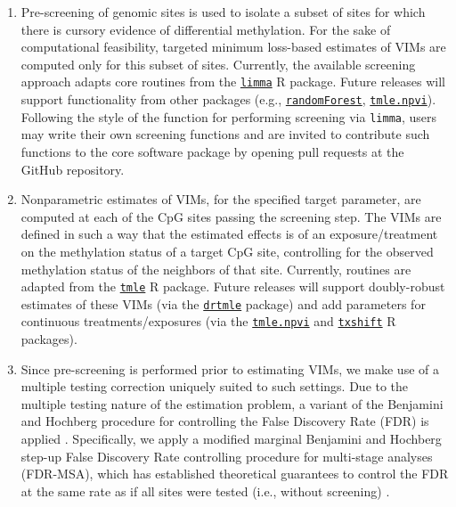 \documentclass[9pt,a4paper,]{extarticle}
\theoremstyle{definition}
\theoremstyle{definition}
\theoremstyle{definition}
\theoremstyle{remark}
\begin{document}
\begin{enumerate}
\def\labelenumi{\arabic{enumi}.}
\item
  Pre-screening of genomic sites is used to isolate a subset of sites for
  which there is cursory evidence of differential methylation. For the sake of
  computational feasibility, targeted minimum loss-based estimates of VIMs are
  computed only for this subset of sites. Currently, the available screening
  approach adapts core routines from the
  \href{http://bioconductor.org/packages/limma}{\texttt{limma}} R
  package. Future releases will support functionality from other packages
  (e.g., \href{https://CRAN.R-project.org/package=randomForest}{\texttt{randomForest}},
  \href{https://CRAN.R-project.org/package=tmle.npvi}{\texttt{tmle.npvi}}). Following the
  style of the function for performing screening via \texttt{limma}, users may write
  their own screening functions and are invited to contribute such functions to
  the core software package by opening pull requests at the GitHub repository.
\item
  Nonparametric estimates of VIMs, for the specified target parameter, are
  computed at each of the CpG sites passing the screening step. The VIMs are
  defined in such a way that the estimated effects is of an exposure/treatment
  on the methylation status of a target CpG site, controlling for the observed
  methylation status of the neighbors of that site. Currently, routines are
  adapted from the \href{https://CRAN.R-project.org/package=tmle}{\texttt{tmle}} R package.
  Future releases will support doubly-robust estimates of these VIMs (via the
  \href{https://cran.r-project.org/package=drtmle}{\texttt{drtmle}} package)
  and add parameters for continuous treatments/exposures (via the
  \href{https://CRAN.R-project.org/package=tmle.npvi}{\texttt{tmle.npvi}} and
  \href{https://github.com/nhejazi/txshift}{\texttt{txshift}} R packages).
\item
  Since pre-screening is performed prior to estimating VIMs, we make use of a
  multiple testing correction uniquely suited to such settings. Due to the
  multiple testing nature of the estimation problem, a variant of the Benjamini
  and Hochberg procedure for controlling the False Discovery Rate (FDR) is
  applied \citep{benjamini1995controlling}. Specifically, we apply a modified
  marginal Benjamini and Hochberg step-up False Discovery Rate controlling
  procedure for multi-stage analyses (FDR-MSA), which has established
  theoretical guarantees to control the FDR at the same rate as if all sites
  were tested (i.e., without screening) \citep{tuglus2009modified}.
\end{enumerate}
\end{document}
